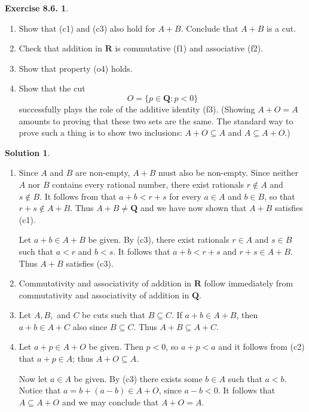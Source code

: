 \documentclass[12pt]{article}
\theoremstyle{definition}
\theoremstyle{exercise}
\newtheorem{exercise}{Exercise 8.6.}
\theoremstyle{solution}
\newtheorem*{solution}{Solution}
\newcommand{\Q}{\mathbf{Q}}
\newcommand{\R}{\mathbf{R}}
\begin{document}
\begin{exercise}
\label{ex:5}
    \begin{enumerate}
        \item Show that (c1) and (c3) also hold for \( A + B \). Conclude that \( A + B \) is a cut.

        \item Check that addition in \( \R \) is commutative (f1) and associative (f2).
        
        \item Show that property (o4) holds.

        \item Show that the cut
        \[
            O = \{ p \in \Q : p < 0 \}
        \]
        successfully plays the role of the additive identity (f3). (Showing \( A + O = A \) amounts to proving that these two sets are the same. The standard way to prove such a thing is to show two inclusions: \( A + O \subseteq A \) and \( A \subseteq A + O \).)
    \end{enumerate}
\end{exercise}

\begin{solution}
    \begin{enumerate}
        \item Since \( A \) and \( B \) are non-empty, \( A + B \) must also be non-empty. Since neither \( A \) nor \( B \) contains every rational number, there exist rationals \( r \not\in A \) and \( s \not\in B \). It follows from  that \( a + b < r + s \) for every \( a \in A \) and \( b \in B \), so that \( r + s \not\in A + B \). Thus \( A + B \neq \Q \) and we have now shown that \( A + B \) satisfies (c1).

        Let \( a + b \in A + B \) be given. By (c3), there exist rationals \( r \in A \) and \( s \in B \) such that \( a < r \) and \( b < s \). It follows that \( a + b < r + s \) and \( r + s \in A + B \). Thus \( A + B \) satisfies (c3).

        \item Commutativity and associativity of addition in \( \R \) follow immediately from commutativity and associativity of addition in \( \Q \).

        \item Let \( A, B, \) and \( C \) be cuts such that \( B \subseteq C \). If \( a + b \in A + B \), then \( a + b \in A + C \) also since \( B \subseteq C \). Thus \( A + B \subseteq A + C \).

        \item Let \( a + p \in A + O \) be given. Then \( p < 0 \), so \( a + p < a \) and it follows from (c2) that \( a + p \in A \); thus \( A + O \subseteq A \).

        Now let \( a \in A \) be given. By (c3) there exists some \( b \in A \) such that \( a < b \). Notice that \( a = b + (a - b) \in A + O \), since \( a - b < 0 \). It follows that \( A \subseteq A + O \) and we may conclude that \( A + O = A \).
    \end{enumerate}
\end{solution}
\end{document}
